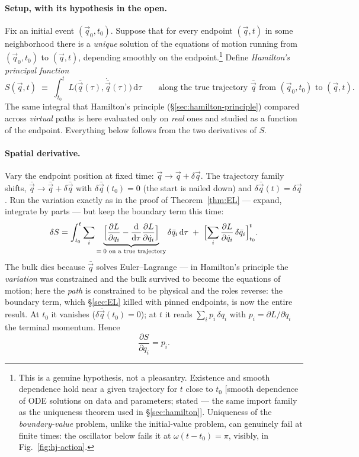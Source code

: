 \documentclass[11pt]{article}
\theoremstyle{plain}
\theoremstyle{definition}
\theoremstyle{remark}
\newcommand{\dd}{\mathrm{d}}
\newcommand{\pd}[2]{\frac{\partial #1}{\partial #2}}
\newcommand{\tot}[2]{\frac{\dd #1}{\dd #2}}
\newcommand{\vq}{\vec{q}}
\begin{document}
\paragraph{Setup, with its hypothesis in the open.}
Fix an initial event $(\vq_0, t_0)$. Suppose that for every endpoint
$(\vq, t)$ in some neighborhood there is a \emph{unique} solution of
the equations of motion running from $(\vq_0, t_0)$ to
$(\vq, t)$, depending smoothly on the endpoint.\footnote{This is a
genuine hypothesis, not a pleasantry. Existence and smooth dependence
hold near a given trajectory for $t$ close to $t_0$ [smooth dependence
of ODE solutions on data and parameters; stated --- the same import
family as the uniqueness theorem used in \S\ref{sec:hamilton}].
Uniqueness of the \emph{boundary-value} problem, unlike the
initial-value problem, can genuinely fail at finite times: the
oscillator below fails it at $\omega(t - t_0) = \pi$, visibly, in
Fig.~\ref{fig:hj-action}.} Define \emph{Hamilton's principal function}
\begin{equation}
  S(\vq, t)
  \;\equiv\;
  \int_{t_0}^{t} L\bigl(\bar\vq(\tau), \dot{\bar\vq}(\tau)\bigr)
  \,\dd\tau
  \qquad
  \text{along the true trajectory } \bar\vq \text{ from }
  (\vq_0, t_0) \text{ to } (\vq, t) .
  \label{eq:principal-function}
\end{equation}
The same integral that Hamilton's principle
(\S\ref{sec:hamilton-principle}) compared across \emph{virtual} paths
is here evaluated only on \emph{real} ones and studied as a function of
the endpoint. Everything below follows from the two derivatives of $S$.

\paragraph{Spatial derivative.}
Vary the endpoint position at fixed time: $\vq \to \vq + \delta\vq$.
The trajectory family shifts, $\bar\vq \to \bar\vq + \delta\bar\vq$
with $\delta\bar\vq(t_0) = 0$ (the start is nailed down) and
$\delta\bar\vq(t) = \delta\vq$. Run the variation exactly as in the
proof of Theorem~\ref{thm:EL} --- expand, integrate by parts --- but
keep the boundary term this time:
\begin{equation}
  \delta S
  = \int_{t_0}^{t}\sum_i
    \underbrace{\Bigl[\pd{L}{q_i}
    - \tot{}{\tau}\pd{L}{\dot q_i}\Bigr]}_{=\;0
    \text{ on a true trajectory}}
    \delta\bar q_i\,\dd\tau
  \;+\;
  \Bigl[\sum_i \pd{L}{\dot q_i}\,\delta\bar q_i
  \Bigr]_{t_0}^{t} .
\end{equation}
The bulk dies because $\bar\vq$ solves Euler--Lagrange --- in
Hamilton's principle the \emph{variation} was constrained and the bulk
survived to become the equations of motion; here the \emph{path} is
constrained to be physical and the roles reverse: the boundary term,
which \S\ref{sec:EL} killed with pinned endpoints, is now the entire
result. At $t_0$ it vanishes ($\delta\bar\vq(t_0) = 0$); at $t$ it
reads $\sum_i p_i\,\delta q_i$ with
$p_i = \partial L/\partial\dot q_i$ the terminal momentum. Hence
\begin{equation}
  \pd{S}{q_i} = p_i .
  \label{eq:dSdq}
\end{equation}
\end{document}
